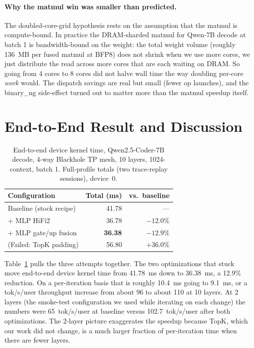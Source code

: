 \documentclass[sigplan,nonacm]{acmart}
\begin{document}
\paragraph{Why the matmul win was smaller than predicted.} The
doubled-core-grid hypothesis rests on the assumption that the matmul
is compute-bound. In practice the DRAM-sharded matmul for Qwen-7B
decode at batch 1 is bandwidth-bound on the weight: the total weight
volume (roughly 136~MB per fused matmul at BFP8) does not shrink
when we use more cores, we just distribute the read across more cores
that are each waiting on DRAM. So going from 4 cores to 8 cores did
not halve wall time the way doubling per-core \emph{work} would.
The dispatch savings are real but small (fewer op launches), and
the binary\_ng side-effect turned out to matter more than the matmul
speedup itself.

\section{End-to-End Result and Discussion}
\label{sec:final}

\begin{table}[h]
\centering
\small
\caption{End-to-end device kernel time, Qwen2.5-Coder-7B decode,
4-way Blackhole TP mesh, 10 layers, 1024-context, batch 1. Full-profile
totals (two trace-replay sessions), device~0.}
\label{tab:final}
\begin{tabular}{lrr}
\toprule
Configuration & Total (ms) & vs.\ baseline \\
\midrule
Baseline (stock recipe)          & 41.78 &  --- \\
$+$ MLP HiFi2                    & 36.78 & ${-}12.0\%$ \\
$+$ MLP gate/up fusion           & \textbf{36.38} & \textbf{${-}12.9\%$} \\
\midrule
(Failed: TopK padding)           & 56.80 & $+36.0\%$ \\
\bottomrule
\end{tabular}
\end{table}

Table~\ref{tab:final} pulls the three attempts together. The two
optimizations that stuck move end-to-end device kernel time from
41.78~ms down to 36.38~ms, a 12.9\% reduction. On a per-iteration
basis that is roughly 10.4~ms going to 9.1~ms, or a tok/s/user
throughput increase from about 96 to about 110 at 10 layers. At 2
layers (the smoke-test configuration we used while iterating on
each change) the numbers were 65~tok/s/user at baseline versus
102.7~tok/s/user after both optimizations. The 2-layer picture
exaggerates the speedup because TopK, which our work did not change,
is a much larger fraction of per-iteration time when there are
fewer layers.
\end{document}
